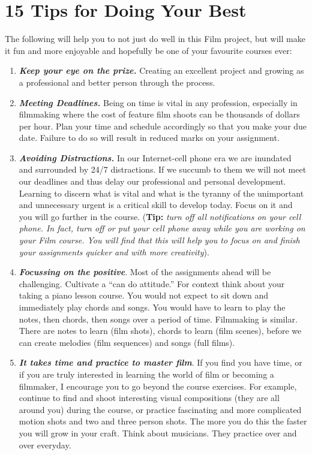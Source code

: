 \documentclass[
]{book}
\begin{document}
\hypertarget{tips-for-doing-your-best}{%
\section{15 Tips for Doing Your Best}\label{tips-for-doing-your-best}}

The following will help you to not just do well in this Film project, but will make it fun and more enjoyable and hopefully be one of your favourite courses ever:

\begin{enumerate}
\def\labelenumi{\arabic{enumi}.}
\item
  \textbf{\emph{Keep your eye on the prize.}} Creating an excellent project and growing as a professional and better person through the process.
\item
  \textbf{\emph{Meeting Deadlines.}} Being on time is vital in any profession, especially in filmmaking where the cost of feature film shoots can be thousands of dollars per hour. Plan your time and schedule accordingly so that you make your due date. Failure to do so will result in reduced marks on your assignment.
\item
  \textbf{\emph{Avoiding Distractions.}} In our Internet-cell phone era we are inundated and surrounded by 24/7 distractions. If we succumb to them we will not meet our deadlines and thus delay our professional and personal development. Learning to discern what is vital and what is the tyranny of the unimportant and unnecessary urgent is a critical skill to develop today. Focus on it and you will go further in the course. (\textbf{Tip:} \emph{turn off all notifications on your cell phone. In fact, turn off or put your cell phone away while you are working on your Film course. You will find that this will help you to focus on and finish your assignments quicker and with more creativity}).
\item
  \textbf{\emph{Focussing on the positive}}. Most of the assignments ahead will be challenging. Cultivate a ``can do attitude.'' For context think about your taking a piano lesson course. You would not expect to sit down and immediately play chords and songs. You would have to learn to play the notes, then chords, then songs over a period of time. Filmmaking is similar. There are notes to learn (film shots), chords to learn (film scenes), before we can create melodies (film sequences) and songs (full films).
\item
  \textbf{\emph{It takes time and practice to master film}}. If you find you have time, or if you are truly interested in learning the world of film or becoming a filmmaker, I encourage you to go beyond the course exercises. For example, continue to find and shoot interesting visual compositions (they are all around you) during the course, or practice fascinating and more complicated motion shots and two and three person shots. The more you do this the faster you will grow in your craft. Think about musicians. They practice over and over everyday.

\end{enumerate}
\end{document}
